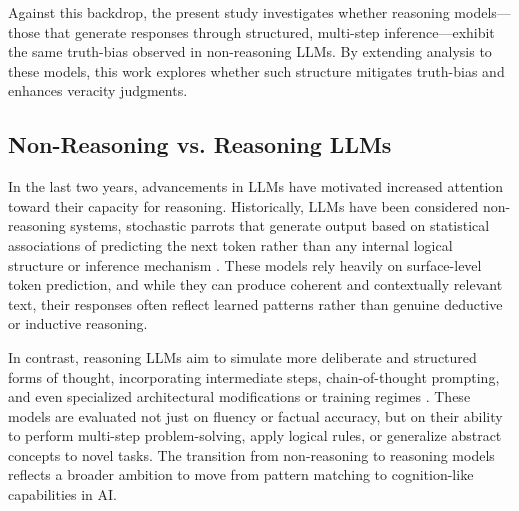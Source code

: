 \documentclass{article}
\begin{document}
Against this backdrop, the present study investigates whether reasoning models---those that generate responses through structured, multi-step inference---exhibit the same truth-bias observed in non-reasoning LLMs. By extending analysis to these models, this work explores whether such structure mitigates truth-bias and enhances veracity judgments.

\subsection{Non-Reasoning vs. Reasoning LLMs}

In the last two years, advancements in LLMs have motivated increased attention toward their capacity for reasoning. Historically, LLMs have been considered non-reasoning systems, stochastic parrots that generate output based on statistical associations of predicting the next token rather than any internal logical structure or inference mechanism \citep{10.1145/3442188.3445922}. These models rely heavily on surface-level token prediction, and while they can produce coherent and contextually relevant text, their responses often reflect learned patterns rather than genuine deductive or inductive reasoning.

In contrast, reasoning LLMs aim to simulate more deliberate and structured forms of thought, incorporating intermediate steps, chain-of-thought prompting, and even specialized architectural modifications or training regimes \citep{wei2023chainofthoughtpromptingelicitsreasoning}. These models are evaluated not just on fluency or factual accuracy, but on their ability to perform multi-step problem-solving, apply logical rules, or generalize abstract concepts to novel tasks. The transition from non-reasoning to reasoning models reflects a broader ambition to move from pattern matching to cognition-like capabilities in AI.

\end{document}

